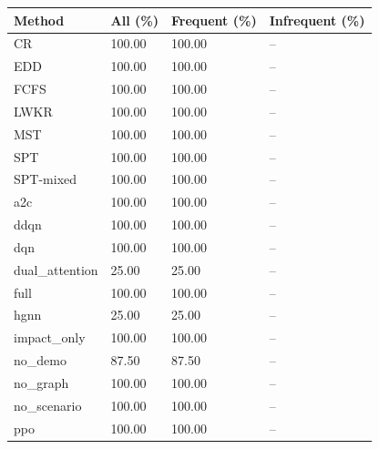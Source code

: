 \begin{tabular}{llll}
\toprule
Method & All (\%) & Frequent (\%) & Infrequent (\%)\\
\midrule
CR & 100.00 & 100.00 & --\\
EDD & 100.00 & 100.00 & --\\
FCFS & 100.00 & 100.00 & --\\
LWKR & 100.00 & 100.00 & --\\
MST & 100.00 & 100.00 & --\\
SPT & 100.00 & 100.00 & --\\
SPT-mixed & 100.00 & 100.00 & --\\
a2c & 100.00 & 100.00 & --\\
ddqn & 100.00 & 100.00 & --\\
dqn & 100.00 & 100.00 & --\\
dual\_attention & 25.00 & 25.00 & --\\
full & 100.00 & 100.00 & --\\
hgnn & 25.00 & 25.00 & --\\
impact\_only & 100.00 & 100.00 & --\\
no\_demo & 87.50 & 87.50 & --\\
no\_graph & 100.00 & 100.00 & --\\
no\_scenario & 100.00 & 100.00 & --\\
ppo & 100.00 & 100.00 & --\\
\bottomrule
\end{tabular}